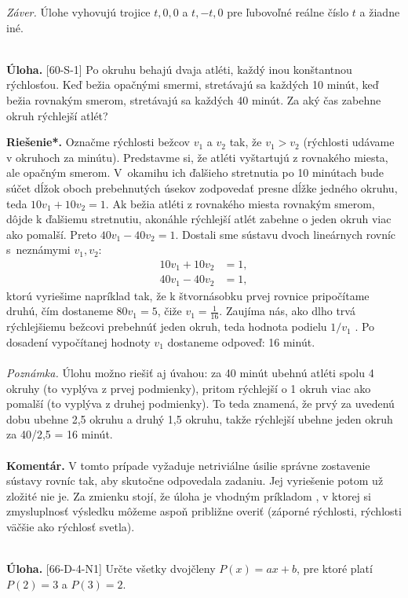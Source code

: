 \documentclass[11pt,a4paper,oneside,final]{book}
\newcommand{\kom}{\textbf{Komentár.} }
\newcommand{\ul}{\textbf{Úloha.} }
\newcommand{\rieh}{\textbf{Riešenie*.} }
\begin{document}
\textit{Záver.} Úlohe vyhovujú trojice $t, 0, 0$ a $t, -t, 0$ pre ľubovoľné reálne číslo $t$ a žiadne iné.\\
\\
\begin{tcolorbox}[breakable,notitle,boxrule=0pt,colback=light-gray,colframe=light-gray]\ul [60-S-1]
Po okruhu behajú dvaja atléti, každý inou konštantnou rýchlosťou. Keď bežia opačnými smermi, stretávajú sa každých 10 minút, keď bežia rovnakým smerom, stretávajú sa každých 40 minút. Za aký čas zabehne okruh rýchlejší atlét?

\end{tcolorbox}

\rieh Označme rýchlosti bežcov $v_1$ a $v_2$ tak, že $v_1 > v_2$ (rýchlosti udávame v okruhoch za minútu). Predstavme si, že atléti vyštartujú z rovnakého miesta, ale opačným smerom. V~okamihu ich ďalšieho stretnutia po 10 minútach bude súčet dĺžok oboch prebehnutých úsekov zodpovedať presne dĺžke jedného okruhu, teda
$10v_1 +10v_2= 1$.
Ak bežia atléti z rovnakého miesta rovnakým smerom, dôjde k ďalšiemu stretnutiu, akonáhle rýchlejší atlét zabehne o jeden okruh viac ako pomalší. Preto $40v_1 -40v_2 = 1$.
Dostali sme sústavu dvoch lineárnych rovníc s~neznámymi $v_1 , v_2$:
\begin{align*}
10v_1 + 10v_2 &= 1,\\
40v_1 - 40v_2 &= 1,
\end{align*}
ktorú vyriešime napríklad tak, že k štvornásobku prvej rovnice pripočítame druhú, čím dostaneme $80v_1 = 5$, čiže $v_1 =\frac{1}{16}$. Zaujíma nás, ako dlho trvá rýchlejšiemu bežcovi prebehnúť jeden okruh, teda hodnota podielu $1/v_1$ . Po dosadení vypočítanej hodnoty $v_1$ dostaneme odpoveď: 16 minút.\\
\\
\textit{Poznámka.} Úlohu možno riešiť aj úvahou: za 40 minút ubehnú atléti spolu 4 okruhy (to vyplýva z prvej podmienky), pritom rýchlejší o 1 okruh viac ako pomalší (to vyplýva z druhej podmienky). To teda znamená, že prvý za uvedenú dobu ubehne 2,5 okruhu a druhý 1,5 okruhu, takže rýchlejší ubehne jeden okruh za 40/2,5 = 16 minút.\\
\\
\kom V tomto prípade vyžaduje netriviálne úsilie správne zostavenie sústavy rovníc tak, aby skutočne odpovedala zadaniu. Jej vyriešenie potom už zložité nie je. Za zmienku stojí, že úloha je vhodným príkladom , v ktorej si zmysluplnosť výsledku môžeme aspoň približne overiť (záporné rýchlosti, rýchlosti väčšie ako rýchlosť svetla).\\
\\
\begin{tcolorbox}[breakable,notitle,boxrule=0pt,colback=light-gray,colframe=light-gray]\ul [66-D-4-N1] Určte všetky dvojčleny $P (x) = ax + b$, pre ktoré platí $P(2) = 3$ a $P (3) = 2$.

\end{tcolorbox}
\end{document}
